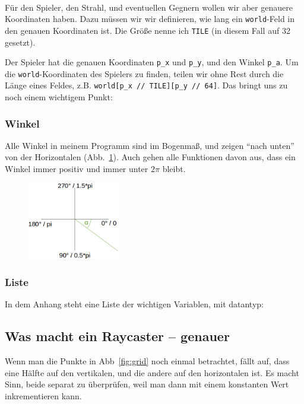 \documentclass[a4paper,12pt]{report}
\begin{document}
\paragraph*{}
Für den Spieler, den Strahl, und eventuellen Gegnern wollen wir aber genauere Koordinaten haben. Dazu müssen wir wir definieren, wie lang ein \texttt{world}-Feld in den genauen Koordinaten ist. Die Größe nenne ich \texttt{TILE} (in diesem Fall auf 32 gesetzt).

Der Spieler hat die genauen Koordinaten \texttt{p\_x} und \texttt{p\_y}, und den Winkel \texttt{p\_a}. Um die \texttt{world}-Koordinaten des Spielers zu finden, teilen wir ohne Rest durch die Länge eines Feldes, z.B. \texttt{world[p\_x // TILE][p\_y // 64]}. Das bringt uns zu noch einem wichtigem Punkt:

\subsubsection{Winkel}
Alle Winkel in meinem Programm sind im Bogenmaß, und zeigen ``nach unten'' von der Horizontalen (Abb.~\ref{fig:angles}). Auch gehen alle Funktionen davon aus, dass ein Winkel immer positiv und immer unter $2\pi$ bleibt.
\begin{figure}[htbp] 
        \centering
        \includegraphics[width=4cm]{angles.png} 
        \label{fig:angles}
\end{figure}

\subsubsection{Liste}
In dem Anhang steht eine Liste der wichtigen Variablen, mit datantyp:


\subsection{Was macht ein Raycaster -- genauer}
Wenn man die Punkte in Abb~\ref{fig:grid} noch einmal betrachtet, fällt auf, dass eine Hälfte auf den vertikalen, und die andere auf den horizontalen ist. Es macht Sinn, beide separat zu überprüfen, weil man dann mit einem konstanten Wert inkrementieren kann.
\end{document}
